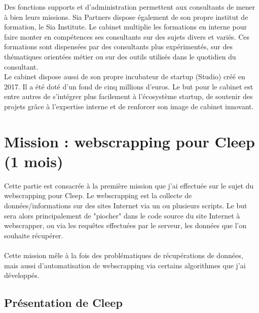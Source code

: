 \documentclass{article} %
\begin{document}
Des fonctions supports et d’administration permettent aux consultants de mener à bien leurs missions. Sia Partners dispose également de son propre institut de formation, le Sia Institute. Le cabinet multiplie les formations en interne pour faire monter en compétences ses consultants sur des sujets divers et variés. Ces formations sont dispensées par des consultants plus expérimentés, sur des thématiques orientées métier ou sur des outils utilisés dans le quotidien du consultant. \\

Le cabinet dispose aussi de son propre incubateur de startup (Studio) créé en 2017. Il a été doté d’un fond de cinq millions d’euros. Le but pour le cabinet est entre autres de s’intégrer plus facilement à l’écosystème startup, de soutenir des projets grâce à l’expertise interne et de renforcer son image de cabinet innovant. 



\newpage

\section{Mission : webscrapping pour Cleep (1 mois)}
Cette partie est consacrée à la première mission que j'ai effectuée sur le sujet du webscrapping pour Cleep. Le webscrapping est la collecte de données/informations sur des sites Internet via un ou plusieurs scripts. Le but sera alors principalement de "piocher" dans le code source du site Internet à webscrapper, ou via les requêtes effectuées par le serveur, les données que l'on souhaite récupérer.\\ \\
Cette mission mêle à la fois des problématiques de récupérations de données, mais aussi d'automatisation de webscrapping via certains algorithmes que j'ai développés.

\subsection{Présentation de Cleep}
\end{document}
